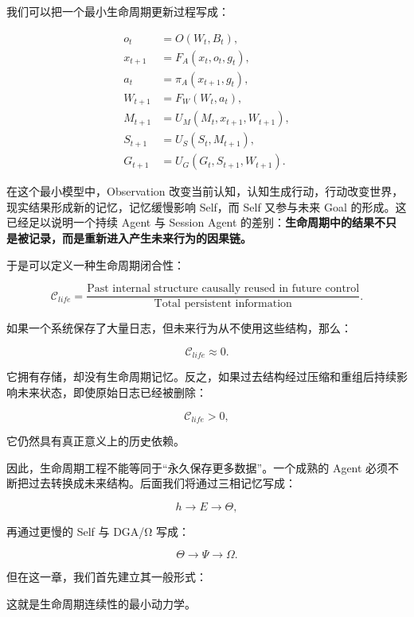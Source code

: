 我们可以把一个最小生命周期更新过程写成：

\[
\begin{aligned}
o_t &= O(W_t,B_t),\\
x_{t+1} &= F_A(x_t,o_t,g_t),\\
a_t &= \pi_A(x_{t+1},g_t),\\
W_{t+1} &= F_W(W_t,a_t),\\
M_{t+1} &= U_M(M_t,x_{t+1},W_{t+1}),\\
S_{t+1} &= U_S(S_t,M_{t+1}),\\
G_{t+1} &= U_G(G_t,S_{t+1},W_{t+1}).
\end{aligned}
\]

在这个最小模型中，Observation 改变当前认知，认知生成行动，行动改变世界，现实结果形成新的记忆，记忆缓慢影响 Self，而 Self 又参与未来 Goal 的形成。这已经足以说明一个持续 Agent 与 Session Agent 的差别：\textbf{生命周期中的结果不只是被记录，而是重新进入产生未来行为的因果链。}

于是可以定义一种生命周期闭合性：

\[
\boxed{
\mathcal{C}_{life}
=
\frac{
\text{Past internal structure causally reused in future control}
}{
\text{Total persistent information}
}.
}
\]

如果一个系统保存了大量日志，但未来行为从不使用这些结构，那么：

\[
\mathcal{C}_{life}\approx 0.
\]

它拥有存储，却没有生命周期记忆。反之，如果过去结构经过压缩和重组后持续影响未来状态，即使原始日志已经被删除：

\[
\mathcal{C}_{life}>0,
\]

它仍然具有真正意义上的历史依赖。

因此，生命周期工程不能等同于“永久保存更多数据”。一个成熟的 Agent 必须不断把过去转换成未来结构。后面我们将通过三相记忆写成：

\[
h
\rightarrow
E
\rightarrow
\Theta,
\]

再通过更慢的 Self 与 DGA/Ω 写成：

\[
\Theta
\rightarrow
\Psi
\rightarrow
\Omega.
\]

但在这一章，我们首先建立其一般形式：

\begin{statementbox}
\centering
{}
\end{statementbox}

这就是生命周期连续性的最小动力学。

